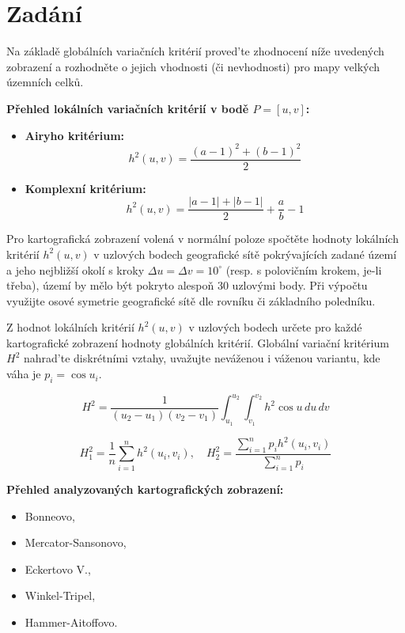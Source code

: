 \section*{Zadání}
Na základě globálních variačních kritérií proved'te zhodnocení níže uvedených zobrazení a rozhodněte o jejich vhodnosti (či nevhodnosti) pro mapy velkých územních celků. 

\textbf{Přehled lokálních variačních kritérií v bodě $P=[u,v]$:}

\begin{itemize}
	\item \textbf{Airyho kritérium:} 
	\begin{equation*}
		h^{2}(u,v)=\frac{(a-1)^{2}+(b-1)^{2}}{2} 
	\end{equation*}
	\item \textbf{Komplexní kritérium:}
	\begin{equation*}
		h^{2}(u,v)=\frac{|a-1|+|b-1|}{2}+\frac{a}{b}-1 
	\end{equation*}
\end{itemize}

Pro kartografická zobrazení volená v normální poloze spočtěte hodnoty lokálních kritérií $h^{2}(u,v)$ v uzlových bodech geografické sítě pokrývajících zadané území a jeho nejbližší okolí s kroky $\Delta u=\Delta v=10^{\circ}$ (resp. s polovičním krokem, je-li třeba), území by mělo být pokryto alespoň 30 uzlovými body.
 Při výpočtu využijte osové symetrie geografické sítě dle rovníku či základního poledníku. 

Z hodnot lokálních kritérií $h^{2}(u,v)$ v uzlových bodech určete pro každé kartografické zobrazení hodnoty globálních kritérií.
 Globální variační kritérium $H^{2}$  nahrad'te diskrétními vztahy, uvažujte neváženou i váženou variantu, kde váha je $p_{i}=\cos u_{i}$. 

\begin{equation*}
	H^{2}=\frac{1}{(u_{2}-u_{1})(v_{2}-v_{1})}\int_{u_{1}}^{u_{2}}\int_{v_{1}}^{v_{2}}h^{2}\cos u \, du \, dv 
\end{equation*}

\begin{equation*}
	H_{1}^{2}=\frac{1}{n}\sum_{i=1}^{n}h^{2}(u_{i},v_{i}), \quad H_{2}^{2}=\frac{\sum_{i=1}^{n}p_{i}h^{2}(u_{i},v_{i})}{\sum_{i=1}^{n}p_{i}} 
\end{equation*}

\textbf{Přehled analyzovaných kartografických zobrazení:}
\begin{itemize}
	\item Bonneovo, 
	\item Mercator-Sansonovo, 
	\item Eckertovo V., 
	\item Winkel-Tripel, 
	\item Hammer-Aitoffovo. 
\end{itemize}


